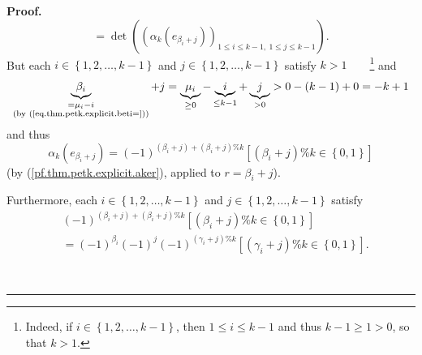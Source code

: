 \documentclass[numbers=enddot,12pt,final,onecolumn,notitlepage]{scrartcl}%
\theoremstyle{definition}
\newenvironment{proof}[1][Proof]{\noindent\textbf{#1.} }{\ \rule{0.5em}{0.5em}}
\begin{document}
\begin{proof}
\begin{equation}
=\det\left(  \left(  \alpha_{k}\left(  e_{\beta_{i}+j}\right)  \right)
_{1\leq i\leq k-1,\ 1\leq j\leq k-1}\right)  .
\label{pf.thm.petk.explicit.as-det-1}%
\end{equation}
But each $i\in\left\{  1,2,\ldots,k-1\right\}  $ and $j\in\left\{
1,2,\ldots,k-1\right\}  $ satisfy $k>1$\ \ \ \ \footnote{Indeed, if
$i\in\left\{  1,2,\ldots,k-1\right\}  $, then $1\leq i\leq k-1$ and thus
$k-1\geq1>0$, so that $k>1$.} and%
\[
\underbrace{\beta_{i}}_{\substack{=\mu_{i}-i\\\text{(by
(\ref{eq.thm.petk.explicit.beti=}))}}}+j=\underbrace{\mu_{i}}_{\geq
0}-\underbrace{i}_{\leq k-1}+\underbrace{j}_{>0}>0-\left(  k-1\right)
+0=-k+1
\]
and thus%
\begin{equation}
\alpha_{k}\left(  e_{\beta_{i}+j}\right)  =\left(  -1\right)  ^{\left(
\beta_{i}+j\right)  +\left(  \beta_{i}+j\right)  \%k}\left[  \left(  \beta
_{i}+j\right)  \%k\in\left\{  0,1\right\}  \right]
\label{pf.thm.petk.explicit.akem1a}%
\end{equation}
(by (\ref{pf.thm.petk.explicit.aker}), applied to $r=\beta_{i}+j$).

Furthermore, each $i\in\left\{  1,2,\ldots,k-1\right\}  $ and $j\in\left\{
1,2,\ldots,k-1\right\}  $ satisfy%
\begin{align}
&  \left(  -1\right)  ^{\left(  \beta_{i}+j\right)  +\left(  \beta
_{i}+j\right)  \%k}\left[  \left(  \beta_{i}+j\right)  \%k\in\left\{
0,1\right\}  \right] \nonumber\\
&  =\left(  -1\right)  ^{\beta_{i}}\left(  -1\right)  ^{j}\left(  -1\right)
^{\left(  \gamma_{i}+j\right)  \%k}\left[  \left(  \gamma_{i}+j\right)
\%k\in\left\{  0,1\right\}  \right]  . \label{pf.thm.petk.explicit.akem2}%
\end{align}



\end{proof}
\end{document}
